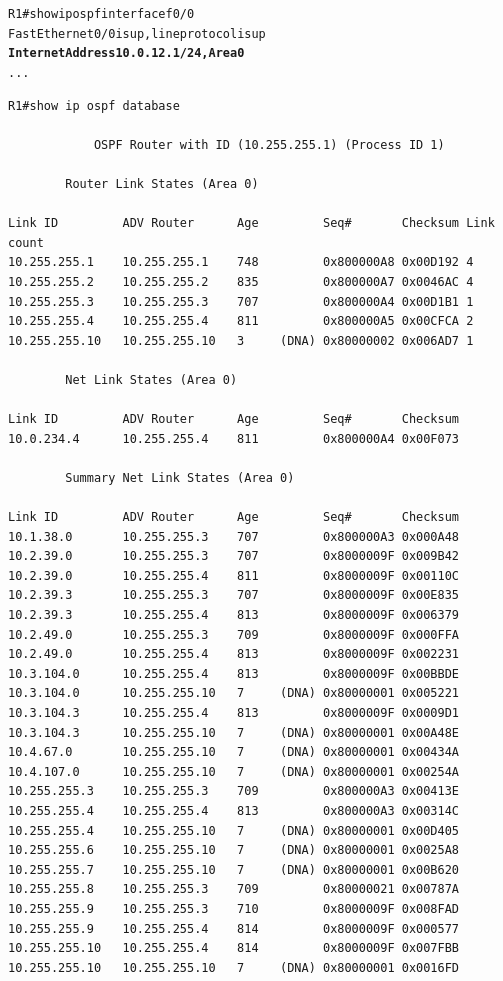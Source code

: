 \documentclass[12pt,twoside,a4paper]{article}
\begin{document}
\noindent
{\selectfont
\begin{small}
\begin{alltt}

R1#show ip ospf interface f0/0
FastEthernet0/0 is up, line protocol is up 
  \textbf{Internet Address 10.0.12.1/24, Area 0}
  ...

\end{alltt}
\end{small}
}

\noindent
{\selectfont
\begin{small}
\begin{verbatim}
R1#show ip ospf database 

            OSPF Router with ID (10.255.255.1) (Process ID 1)

		Router Link States (Area 0)

Link ID         ADV Router      Age         Seq#       Checksum Link count
10.255.255.1    10.255.255.1    748         0x800000A8 0x00D192 4
10.255.255.2    10.255.255.2    835         0x800000A7 0x0046AC 4
10.255.255.3    10.255.255.3    707         0x800000A4 0x00D1B1 1
10.255.255.4    10.255.255.4    811         0x800000A5 0x00CFCA 2
10.255.255.10   10.255.255.10   3     (DNA) 0x80000002 0x006AD7 1

		Net Link States (Area 0)

Link ID         ADV Router      Age         Seq#       Checksum
10.0.234.4      10.255.255.4    811         0x800000A4 0x00F073

		Summary Net Link States (Area 0)

Link ID         ADV Router      Age         Seq#       Checksum
10.1.38.0       10.255.255.3    707         0x800000A3 0x000A48
10.2.39.0       10.255.255.3    707         0x8000009F 0x009B42
10.2.39.0       10.255.255.4    811         0x8000009F 0x00110C
10.2.39.3       10.255.255.3    707         0x8000009F 0x00E835
10.2.39.3       10.255.255.4    813         0x8000009F 0x006379
10.2.49.0       10.255.255.3    709         0x8000009F 0x000FFA
10.2.49.0       10.255.255.4    813         0x8000009F 0x002231
10.3.104.0      10.255.255.4    813         0x8000009F 0x00BBDE
10.3.104.0      10.255.255.10   7     (DNA) 0x80000001 0x005221
10.3.104.3      10.255.255.4    813         0x8000009F 0x0009D1
10.3.104.3      10.255.255.10   7     (DNA) 0x80000001 0x00A48E
10.4.67.0       10.255.255.10   7     (DNA) 0x80000001 0x00434A
10.4.107.0      10.255.255.10   7     (DNA) 0x80000001 0x00254A
10.255.255.3    10.255.255.3    709         0x800000A3 0x00413E
10.255.255.4    10.255.255.4    813         0x800000A3 0x00314C
10.255.255.4    10.255.255.10   7     (DNA) 0x80000001 0x00D405
10.255.255.6    10.255.255.10   7     (DNA) 0x80000001 0x0025A8
10.255.255.7    10.255.255.10   7     (DNA) 0x80000001 0x00B620
10.255.255.8    10.255.255.3    709         0x80000021 0x00787A
10.255.255.9    10.255.255.3    710         0x8000009F 0x008FAD
10.255.255.9    10.255.255.4    814         0x8000009F 0x000577
10.255.255.10   10.255.255.4    814         0x8000009F 0x007FBB
10.255.255.10   10.255.255.10   7     (DNA) 0x80000001 0x0016FD


\end{verbatim}
\end{small}}
\end{document}
